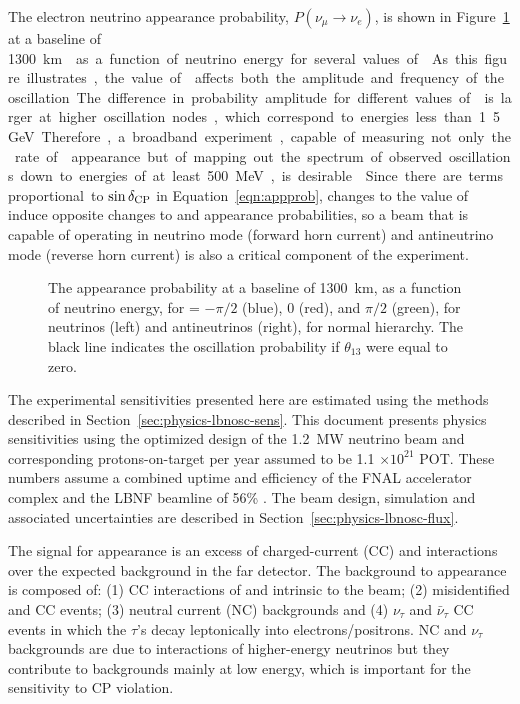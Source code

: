 The electron neutrino appearance probability, $P(\nu_\mu \rightarrow \nu_e)$, 
is shown in 
Figure~\ref{fig:oscprob} 
at a baseline of \SI{1300}\km{} as a function of neutrino 
energy for several values of \deltacp. As this figure illustrates, the value 
of \deltacp affects both the amplitude and frequency of
the oscillation. The difference in probability amplitude
for different values of \deltacp is larger at higher oscillation nodes, which 
correspond to energies less than 1.5~GeV. Therefore, a broadband experiment, 
capable of measuring not only the rate of \nue appearance but of mapping out the 
spectrum of observed oscillations down to energies of at least 500~MeV, 
is desirable~\cite{Diwan:2003bp}. Since there are terms proportional to $\sin\delta_{\rm CP}$ in Equation~\ref{eqn:appprob},
changes to the value of \deltacp induce opposite changes to \nue and
\anue appearance probabilities, so a beam that is capable of operating in
neutrino mode (forward horn current) and antineutrino mode (reverse horn current)
is also a critical component of the experiment.



\begin{figure}
  \centering
  \caption{The appearance probability at a baseline of 1300~km,
  as a function of neutrino energy, for \deltacp = $-\pi/2$ (blue), 
  0 (red), and $\pi/2$ (green), for neutrinos (left) and antineutrinos
  (right), for normal hierarchy. The black line indicates the oscillation
  probability if $\theta_{13}$ were equal to zero.}
  \label{fig:oscprob}
\end{figure}

The experimental sensitivities presented here are estimated using the methods described in Section~\ref{sec:physics-lbnosc-sens}. This document presents physics sensitivities using the optimized design of the 1.2~MW neutrino beam and corresponding protons-on-target per year assumed to be 1.1 $\times 10^{21}$ POT.  These numbers assume a combined uptime and efficiency of the FNAL accelerator complex and the LBNF beamline of 56\% .  The beam design, simulation and associated uncertainties are described in Section~\ref{sec:physics-lbnosc-flux}.

The signal for \nue appearance is an excess of charged-current (CC) \nue and \anue interactions over the expected background in the far detector.  The background to \nue appearance is composed of: (1) CC interactions of \nue and \anue intrinsic to the beam; (2) misidentified \numu and \anumu CC events; (3) neutral current (NC) backgrounds and (4) $\nu_\tau$ and $\bar{\nu}_\tau$ CC events in which the $\tau$'s decay leptonically into electrons/positrons. NC and $\nu_\tau$ backgrounds are due to interactions of higher-energy
neutrinos but they contribute to backgrounds mainly at low energy, which is important for the sensitivity to CP violation.

